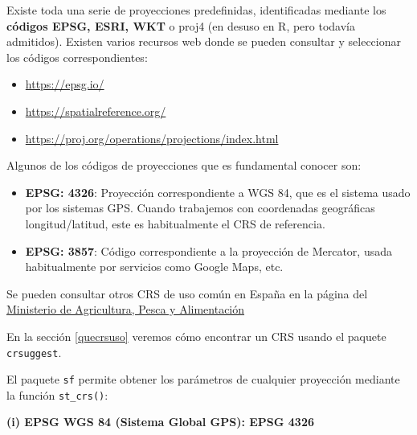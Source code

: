 \documentclass[
]{book}
\begin{document}
Existe toda una serie de proyecciones predefinidas, identificadas mediante los
\textbf{códigos EPSG, ESRI, WKT} o proj4 (en desuso en R, pero todavía admitidos).
Existen varios recursos web donde se pueden consultar y seleccionar los códigos
correspondientes:

\begin{itemize}
\item
  \url{https://epsg.io/}
\item
  \url{https://spatialreference.org/}
\item
  \url{https://proj.org/operations/projections/index.html}
\end{itemize}

Algunos de los códigos de proyecciones que es fundamental conocer son:

\begin{itemize}
\item
  \textbf{EPSG: 4326}: Proyección correspondiente a WGS 84, que es el sistema usado
  por los sistemas GPS. Cuando trabajemos con coordenadas geográficas
  longitud/latitud, este es habitualmente el CRS de referencia.
\item
  \textbf{EPSG: 3857}: Código correspondiente a la proyección de Mercator, usada
  habitualmente por servicios como Google Maps, etc.
\end{itemize}

Se pueden consultar otros CRS de uso común en España en la página del
\href{https://www.mapa.gob.es/es/cartografia-y-sig/ide/directorio_datos_servicios/caracteristicas_wms.aspx}{Ministerio de Agricultura, Pesca y
Alimentación}

En la sección \ref{quecrsuso} veremos cómo encontrar un CRS usando el paquete
\texttt{crsuggest}.

El paquete \texttt{sf} permite obtener los parámetros de cualquier proyección mediante
la función \texttt{st\_crs()}:

\textbf{(i) EPSG WGS 84 (Sistema Global GPS): EPSG 4326}
\end{document}
